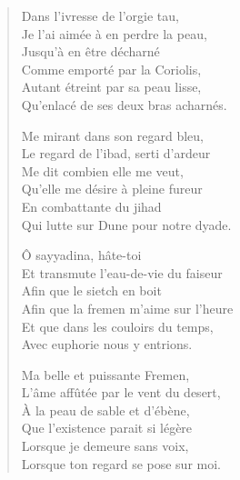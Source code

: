 \begin{verse}%
  \sizain%
  Dans l’ivresse de l’orgie tau,\\  %
  Je l’ai aimée à en perdre la peau,\\  %
  Jusqu’à en être décharné\\  %
  Comme emporté par la Coriolis,\\  %
  Autant étreint par sa peau lisse,\\  %
  Qu’enlacé de ses deux bras acharnés.

  Me mirant dans son regard bleu,\\  %
  Le regard de l’ibad, serti d’ardeur\\  %
  Me dit combien elle me veut,\\  %
  Qu’elle me désire à pleine fureur\\  %
  En combattante du jihad\\  %
  Qui lutte sur Dune pour notre dyade.

  Ô sayyadina, hâte-toi\\  %
  Et transmute l’eau-de-vie du faiseur\\  %
  Afin que le sietch en boit\\  %
  Afin que la fremen m’aime sur l’heure\\  %
  Et que dans les couloirs du temps,\\  %
  Avec euphorie nous y entrions.

  Ma belle et puissante Fremen,\\  %
  L’âme affûtée par le vent du desert,\\  %
  À la peau de sable et d’ébène,\\  %
  Que l’existence parait si légère\\  %
  Lorsque je demeure sans voix,\\  %
  Lorsque ton regard se pose sur moi.


\end{verse}
